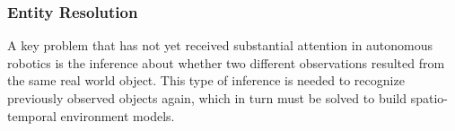 

\subsubsection{Entity Resolution}
\label{sec:entity-resolution}

A key problem that has not yet received substantial attention in
autonomous robotics is the inference about whether two different
observations resulted from the same real world object. This type
of inference is needed to recognize previously observed objects again,
which in turn must be solved to build spatio-temporal environment models.


